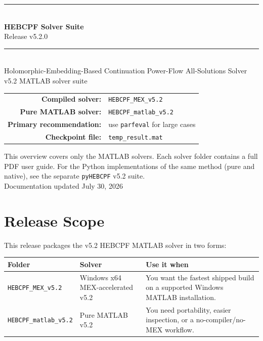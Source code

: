 \documentclass[11pt,a4paper]{article}
\newcommand{\code}[1]{\texttt{#1}}
\begin{document}
\begin{titlepage}
\centering
\vspace*{2.0cm}
{\color{rule}\rule{\textwidth}{1.2pt}}\\[8pt]
{\Huge\bfseries HEBCPF Solver Suite}\\[8pt]
{\Large Release v5.2.0}\\[8pt]
{\color{rule}\rule{\textwidth}{1.2pt}}\\[18pt]
{\large Holomorphic-Embedding-Based Continuation Power-Flow All-Solutions Solver}\\[12pt]
{\large v5.2 MATLAB solver suite}\\[24pt]

\begin{tabular}{rl}
\textbf{Compiled solver:} & \code{HEBCPF_MEX_v5.2}\\[3pt]
\textbf{Pure MATLAB solver:} & \code{HEBCPF_matlab_v5.2}\\[3pt]
\textbf{Primary recommendation:} & use \code{parfeval} for large cases\\[3pt]
\textbf{Checkpoint file:} & \code{temp_result.mat}\\
\end{tabular}

\vfill
{\small This overview covers only the MATLAB solvers. Each solver folder contains a full
PDF user guide. For the Python implementations of the same method (pure and native), see
the separate \code{pyHEBCPF} v5.2 suite.}\\[6pt]
{\small Documentation updated July 30, 2026}
\end{titlepage}

\clearpage
{}
\tableofcontents
\newpage

\section{Release Scope}

This release packages the v5.2 HEBCPF MATLAB solver in two forms:

\begin{center}
\begin{tabular}{@{}p{}p{}p{}@{}}
\toprule
\textbf{Folder} & \textbf{Solver} & \textbf{Use it when}\\
\midrule
\textcolor{mexcol}{\code{HEBCPF_MEX_v5.2}} & Windows x64 MEX-accelerated v5.2 &
You want the fastest shipped build on a supported Windows MATLAB installation.\\
\textcolor{matcol}{\code{HEBCPF_matlab_v5.2}} & Pure MATLAB v5.2 &
You need portability, easier inspection, or a no-compiler/no-MEX workflow.\\
\bottomrule
\end{tabular}
\end{center}
\end{document}
